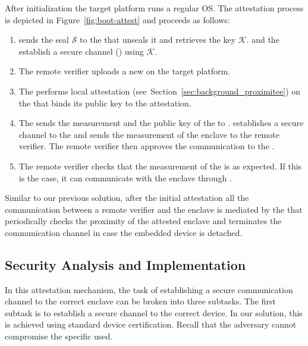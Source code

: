  After initialization the target platform runs a regular OS. The attestation process is depicted in Figure~\ref{fig:boot-attest} and proceeds as follows:

\begin{enumerate}


  \item[\one] \device sends the seal $\mathcal{S}$ to the \nameclave that unseals it and retrieves the key $\mathcal{K}$. \device and the \nameclave establish a secure channel (\tls) using $\mathcal{K}$.

  \item[\two] The remote verifier uploads a new \app on the target platform.

  \item[\three] The \nameclave performs local attestation (see~Section~\ref{sec:background_proximitee}) on the \app that binds its public key to the attestation. %

  \item[\four] The \nameclave sends the measurement and the public key of the \app to \device. \device establishes a secure channel to the \app and sends the measurement of the enclave to the remote verifier. The remote verifier then approves the communication to the \app.

  \item[\five] The remote verifier checks that the measurement of the \app is as expected. If this is the case, it can communicate with the enclave through \device.


\end{enumerate}


Similar to our previous solution, after the initial attestation all the communication between a remote verifier and the enclave is mediated by the \device that periodically checks the proximity of the attested enclave and terminates the communication channel in case the embedded device is detached.


\subsection{Security Analysis and Implementation}
 
In this attestation mechanism, the task of establishing a secure communication channel to the correct enclave can be broken into three subtasks. The first subtask is to establish a secure channel to the correct \device device. In our solution, this is achieved using standard device certification. Recall that the adversary cannot compromise the specific \device used. 

